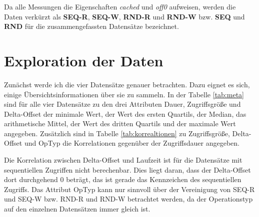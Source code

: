 \documentclass[
	twoside,
	12pt,
	a4paper,
	BCOR10mm,
	DIV14,
	listof=totoc,
	bibliography=totoc,
	headsepline
]{scrreprt}
\begin{document}
Da alle Messungen die Eigenschaften \textit{cached} und \textit{off0} aufweisen, werden die Daten verkürzt als \textbf{SEQ-R}, \textbf{SEQ-W}, \textbf{RND-R} und \textbf{RND-W} bzw. \textbf{SEQ} und \textbf{RND} für die zusammengefassten Datensätze bezeichnet. 

\section{Exploration der Daten}
\label{eval:exploration}
Zunächst werde ich die vier Datensätze genauer betrachten. Dazu eignet es sich, einige Übersichtsinformationen über sie zu sammeln.
In der Tabelle \ref{tab:meta} sind für alle vier Datensätze zu den drei Attributen Dauer, Zugriffsgröße und Delta-Offset der minimale Wert, der Wert des ersten Quartils, der Median, das arithmetische Mittel, der Wert des dritten Quartils und der maximale Wert angegeben. Zusätzlich sind in Tabelle \ref{tab:korrealtionen} zu Zugriffsgröße, Delta-Offset und OpTyp die Korrelationen gegenüber der Zugriffsdauer angegeben.\medskip

Die Korrelation zwischen Delta-Offset und Laufzeit ist für die Datensätze mit sequentiellen Zugriffen nicht berechenbar. Dies liegt daran, dass der Delta-Offset dort durchgehend 0 beträgt, das ist gerade das Kennzeichen des sequentiellen Zugriffs.
Das Attribut OpTyp kann nur sinnvoll über der Vereinigung von SEQ-R
und SEQ-W bzw. RND-R und RND-W betrachtet werden, da der Operationstyp auf den einzelnen Datensätzen immer gleich ist.
\end{document}
